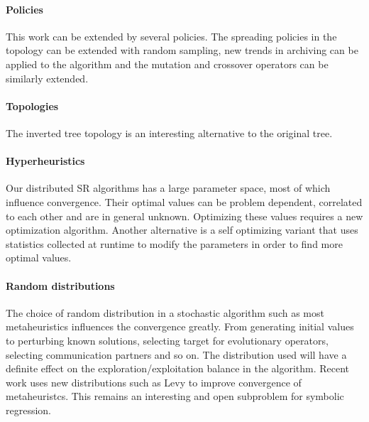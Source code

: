 \paragraph{Policies}
This work can be extended by several policies. The spreading policies in the topology can be extended with random sampling, new trends in archiving can be applied to the algorithm and the mutation and crossover operators can be similarly extended. 

\paragraph{Topologies}
The inverted tree topology is an interesting alternative to the original tree. %

\paragraph{Hyperheuristics}
Our distributed SR algorithms has a large parameter space, most of which influence convergence. Their optimal values can be problem dependent, correlated to each other and are in general unknown. Optimizing these values requires a new optimization algorithm. Another alternative is a self optimizing variant that uses statistics collected at runtime to modify the parameters in order to find more optimal values.

\paragraph{Random distributions}
The choice of random distribution in a stochastic algorithm such as most metaheuristics influences the convergence greatly. From generating initial values to perturbing known solutions, selecting target for evolutionary operators, selecting communication partners and so on. The distribution used will have a definite effect on the exploration/exploitation balance in the algorithm. Recent work uses new distributions such as Levy \citep{ABCLevy} to improve convergence of metaheuristcs. This remains an interesting and open subproblem for symbolic regression. 
